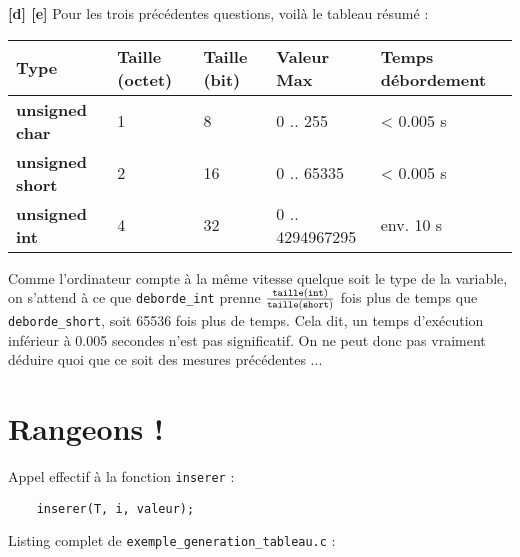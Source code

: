 \documentclass[10pt]{article}
\begin{document}
\begin{enumerate}[label=\textbf{[\alph*]},resume]
  \setlength\itemsep{1em}

\item \textbf{[d] [e]} Pour les trois précédentes questions, voilà le tableau résumé :

  \begin{center}
    \begin{tabular}{|l|l|l|l|l|}
      \hline
      Type & Taille (octet) & Taille (bit) & Valeur Max & Temps débordement \\
      \hline
      \textbf{unsigned char}  & 1 & 8  & 0 .. 255        & < 0.005 s \\
      \textbf{unsigned short} & 2 & 16 & 0 .. 65335      & < 0.005 s \\
      \textbf{unsigned int}   & 4 & 32 & 0 .. 4294967295 & env. 10 s  \\
      \hline
    \end{tabular}
  \end{center}

\setcounter{enumi}{5}
\item Comme l'ordinateur compte à la même vitesse quelque soit le type
  de la variable, on s'attend à ce que {\tt deborde\_int} prenne
  $\frac{{\tt taille(int)}}{{\tt taille(short)}}$ fois plus de temps que {\tt
  deborde\_short}, soit 65536 fois plus de temps. Cela dit, un temps
  d'exécution inférieur à 0.005 secondes n'est pas significatif. On ne
  peut donc pas vraiment déduire quoi que ce soit des mesures
  précédentes ...

\end{enumerate}

\section{Rangeons !}

\begin{enumerate}[label=\textbf{[\alph*]},resume]
  \setlength\itemsep{1em}

\item Appel effectif à la fonction {\tt inserer} :

\begin{verbatim}
    inserer(T, i, valeur);
\end{verbatim}

\item Listing complet de {\tt exemple\_generation\_tableau.c} :

  

\end{enumerate}
\end{document}
